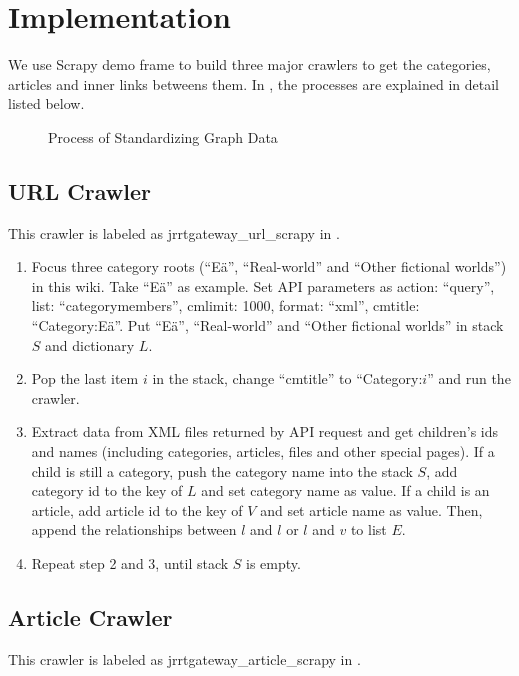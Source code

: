\section{Implementation}
We use Scrapy demo frame to build three major crawlers to get the categories, articles and inner links betweens them. In , the processes are explained in detail listed below.

\begin{figure}
	\centering
	\def\svgwidth{\columnwidth}
	
	\caption{Process of Standardizing Graph Data}
	\label{fig:section2-pic1}
\end{figure}

\subsection{URL Crawler}

This crawler is labeled as jrrtgateway\_url\_scrapy in .

\begin{enumerate}
	\item Focus three category roots (``Eä'', ``Real-world'' and ``Other fictional worlds'') in this wiki. Take ``Eä'' as example. Set API parameters as {action: ``query'', list: ``categorymembers'', cmlimit: 1000, format: ``xml'', cmtitle: ``Category:Eä''}. Put ``Eä'', ``Real-world'' and ``Other fictional worlds'' in stack $S$ and dictionary $L$.
	\item Pop the last item $i$ in the stack, change ``cmtitle'' to ``Category:$i$'' and run the crawler. 
	\item Extract data from XML files returned by API request and get children's ids and names (including categories, articles, files and other special pages). If a child is still a category, push the category name into the stack $S$, add category id to the key of $L$ and set category name as value. If a child is an article, add article id to the key of $V$ and set article name as value. Then, append the relationships between $l$ and $l$ or $l$ and $v$ to list $E$.
	\item Repeat step 2 and 3, until stack $S$ is empty.
\end{enumerate}

\subsection{Article Crawler}

This crawler is labeled as jrrtgateway\_article\_scrapy in .

